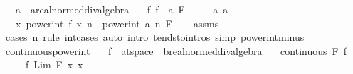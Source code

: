 \begin{isabellebody}
\ \ \ a\ {\isacharcolon}{\kern0pt}{\isacharcolon}{\kern0pt}\ {\isachardoublequoteopen}{\isacharprime}{\kern0pt}a{\isacharcolon}{\kern0pt}{\isacharcolon}{\kern0pt}real{\isacharunderscore}{\kern0pt}normed{\isacharunderscore}{\kern0pt}div{\isacharunderscore}{\kern0pt}algebra{\isachardoublequoteclose}\isanewline
\ \ \ f{\isacharcolon}{\kern0pt}\ {\isachardoublequoteopen}{\isacharparenleft}{\kern0pt}f\ {\isasymlonglongrightarrow}\ a{\isacharparenright}{\kern0pt}\ F{\isachardoublequoteclose}\isanewline
\ \ \ \ \ a{\isacharcolon}{\kern0pt}\ {\isachardoublequoteopen}a\ {\isasymnoteq}\ {}{\isachardoublequoteclose}\isanewline
\ \ \ {\isachardoublequoteopen}{\isacharparenleft}{\kern0pt}{\isacharparenleft}{\kern0pt}{\isasymlambda}x{\isachardot}{\kern0pt}\ power{\isacharunderscore}{\kern0pt}int\ {\isacharparenleft}{\kern0pt}f\ x{\isacharparenright}{\kern0pt}\ n{\isacharparenright}{\kern0pt}\ {\isasymlonglongrightarrow}\ power{\isacharunderscore}{\kern0pt}int\ a\ n{\isacharparenright}{\kern0pt}\ F{\isachardoublequoteclose}\isanewline
%
\isadelimproof
\ \ %
\endisadelimproof
%
\isatagproof
{}\isamarkupfalse%
\ assms\ \isamarkupfalse%
\ {\isacharparenleft}{\kern0pt}cases\ n\ rule{\isacharcolon}{\kern0pt}\ int{\isacharunderscore}{\kern0pt}cases{}{\isacharparenright}{\kern0pt}\ {\isacharparenleft}{\kern0pt}auto\ intro{\isacharbang}{\kern0pt}{\isacharcolon}{\kern0pt}\ tendsto{\isacharunderscore}{\kern0pt}intros\ simp{\isacharcolon}{\kern0pt}\ power{\isacharunderscore}{\kern0pt}int{\isacharunderscore}{\kern0pt}minus{\isacharparenright}{\kern0pt}%
\endisatagproof
{\isafoldproof}%
%
\isadelimproof
\isanewline
%
\endisadelimproof
\isanewline
{}\isamarkupfalse%
\ continuous{\isacharunderscore}{\kern0pt}power{\isacharunderscore}{\kern0pt}int{\isacharcolon}{\kern0pt}\isanewline
\ \ \ f\ {\isacharcolon}{\kern0pt}{\isacharcolon}{\kern0pt}\ {\isachardoublequoteopen}{\isacharprime}{\kern0pt}a{\isacharcolon}{\kern0pt}{\isacharcolon}{\kern0pt}t{}{\isacharunderscore}{\kern0pt}space\ {\isasymRightarrow}\ {\isacharprime}{\kern0pt}b{\isacharcolon}{\kern0pt}{\isacharcolon}{\kern0pt}real{\isacharunderscore}{\kern0pt}normed{\isacharunderscore}{\kern0pt}div{\isacharunderscore}{\kern0pt}algebra{\isachardoublequoteclose}\isanewline
\ \ \ {\isachardoublequoteopen}continuous\ F\ f{\isachardoublequoteclose}\isanewline
\ \ \ \ \ {\isachardoublequoteopen}f\ {\isacharparenleft}{\kern0pt}Lim\ F\ {\isacharparenleft}{\kern0pt}{\isasymlambda}x{\isachardot}{\kern0pt}\ x{\isacharparenright}{\kern0pt}{\isacharparenright}{\kern0pt}\ {\isasymnoteq}\ {}{\isachardoublequoteclose}\isanewline

\end{isabellebody}
